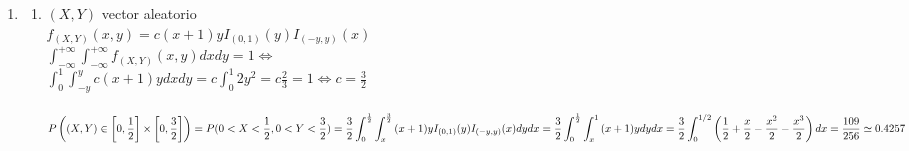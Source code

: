 \documentclass[a4paper,10pt]{article}
\newcommand{\dado}{\mid}
\newcommand{\binomial}[3]{\binom{#1}{#3}{#2}^{#3}{(1-#2)}^{#1-#3}}
\begin{document}
\begin{enumerate}
\begin{enumerate}
\item
$P(\mbox{ Juan tome menos de tres litros de cerveza si había bebido al menos un litro }) = \\
P((X \dado H) < 3 \dado (X \dado H) \geq 1) = \frac {P((X \dado H) < 3 \cap (X \dado H) \geq 1)}{P((X \dado H) \geq 1)}=\frac{\frac{1}{2}}{\frac{3}{4}}=\frac{2}{3} $ porque \\
$\displaystyle P(1 \leq (X \dado H) \leq 3) = \int_{1}^{3} {f_{X \dado H}(x)dx} = \frac{1}{4} \int_{1}^{3} {dx} = \frac{1}{2}$ y \\
$\displaystyle P((X \dado H) \geq 1) = \int_{1}^{\infty} {f_{X \dado H}(x)dx} = \frac{1}{4} \int_{1}^{4} {dx} = \frac{3}{4}$ 
\item
$X = \mbox {cantidad ingerida de cerveza de un invitado de la fiesta}$ \\
Por probabilidad total \\
$P(X>3)=P(X>3 \dado H) P(H) + P(X>3 \dado M) P(M)=\\
P((X \dado H) > 3)P(H)+P((X \dado M) > 3)P(M)$ \\
y como $P(H) = \frac{18}{40}$ (son 18 hombres de cuarenta total en la fiesta) $P(M) = \frac{22}{40}$ (y 22 mujeres de los 40) y \\
$P(X>3)=\frac{1}{4}\frac{18}{40}+0.7\frac{1}{2}=0.4975$ porque \\
$P((X \dado H) > 3)=\frac{1}{4}\int_{3}^{4} {dx} = \frac{1}{4}$
\item
$Y=\mbox{ Cantidad de personas que se emborracharon en la fiesta }$ \\
como considero las alcoholizaciones de la gente independiente
$Y \sim Bi (40,0.4975)$
$P(Y \geq 2) = 1-P(Y<2)=1-(P(Y=0)+P(Y=1))=1-\binomial{40}{0.4975}{0}-\binomial{40}{0.4975}{1} \simeq 1$
\end{enumerate}
\item 
\begin{enumerate}
\item $(X,Y)$ vector aleatorio \\
$f_{(X,Y)}(x,y) = c(x+1)yI_{(0,1)}(y)I_{(-y,y)}(x)$ \\
$\displaystyle \int_{-\infty}^{+\infty}{\int_{-\infty}^{+\infty} {f_{(X,Y)}(x,y)dxdy}} = 1 \Leftrightarrow$\\
$\displaystyle \int_0^1 {\int_{-y}^{y}}{c(x+1)ydxdy} = c\int_{0}^{1} {2y^{2}} = c\frac{2}{3} = 1 \Leftrightarrow c=\frac{3}{2}$ \\ \\
$\displaystyle P \left( (X,Y) \in \left[ 0,\frac{1}{2} \right] \times \left[ 0,\frac{3}{2}\right] \right) = P(0<X<\frac{1}{2},0<Y<\frac{3}{2}) = \\ \frac{3}{2}\int_{0}^{\frac{1}{2}}{\int_{x}^{\frac{3}{2}} {(x+1)yI_{(0,1)}(y)I_{(-y,y)}(x)dydx}} = \frac{3}{2}\int_{0}^{\frac{1}{2}}{\int_{x}^{1} {(x+1)y}dydx} = \frac{3}{2} \int_{0}^{1/2} { \left( \frac{1}{2} + \frac{x}{2} - \frac{x^{2}}{2} - \frac{x^{3}}{2} \right) dx} \\ = \frac{109}{256} \simeq 0.4257$

\end{enumerate}
\end{enumerate}
\end{document}
